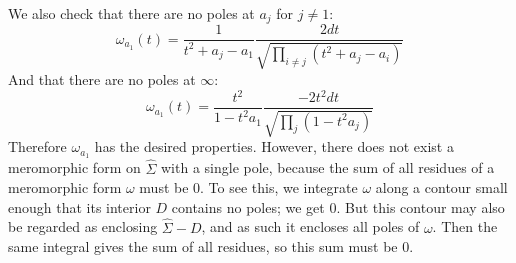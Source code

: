 \documentclass[12 pt]{article}
\theoremstyle{plain}
\theoremstyle{definition}
\theoremstyle{remark}
\begin{document}
We also check that there are no poles at $a_j$ for $j\neq 1$:
\[      \omega_{a_1} (t) = \frac{1}{t^2 + a_j - a_1}   \frac{2 dt}{  \sqrt{ \prod_{i\neq j} (t^2 + a_j - a_i)}}       \]
And that there are no poles at $\infty$:
\[      \omega_{a_1} (t) = \frac{t^2}{1-t^2 a_1}   \frac{ - 2 t^2 dt} {    \sqrt{ \prod_j (1 - t^2 a_j)} }    \]
Therefore $\omega_{a_1}$ has the desired properties. However, there does not exist a meromorphic form on $\hat \Sigma$ with a single pole, because the sum of all residues of a meromorphic form $\omega$ must be 0. To see this, we integrate $\omega$ along a contour small enough that its interior $D$ contains no poles; we get 0. But this contour may also be regarded as enclosing $\hat \Sigma - D$, and as such it encloses all poles of $\omega$. Then the same integral gives the sum of all residues, so this sum must be 0.
\end{document}
